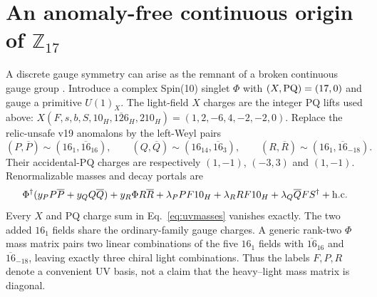 \documentclass[11pt,a4paper]{article}
\begin{document}
\section{An anomaly-free continuous origin of
\texorpdfstring{$\mathbb Z_{17}$}{Z17}}
\label{sec:uv}
A discrete gauge symmetry can arise as the remnant of a broken continuous
gauge group \cite{KW,BanksDine,Ibanez93}. Introduce a complex Spin(10)
singlet $\Phi$ with $(X,{\rm PQ})=(17,0)$ and gauge a primitive
$U(1)_X$. The light-field $X$ charges are the integer PQ lifts used above:
$X(F,s,b,S,10_H,\overline{126}_H,210_H)=(1,2,-6,4,-2,-2,0)$.
Replace the relic-unsafe v19 anomalons by the left-Weyl pairs
\begin{equation}
 (P,\overline P)\sim(16_{1},\overline{16}_{16}),\qquad
 (Q,\overline Q)\sim(16_{14},\overline{16}_{3}),\qquad
 (R,\overline R)\sim(16_{1},\overline{16}_{-18}).
\label{eq:uvfields}
\end{equation}
Their accidental-PQ charges are respectively $(1,-1)$, $(-3,3)$ and
$(1,-1)$. Renormalizable masses and decay portals are
\begin{equation}
 \Phi^\dagger(y_P P\overline P+y_QQ\overline Q)
 +y_R\Phi R\overline R
 +\lambda_P P F10_H+\lambda_R R F10_H
 +\lambda_Q\overline QF S^\dagger+{\rm h.c.}
\label{eq:uvmasses}
\end{equation}
Every $X$ and PQ charge sum in Eq.~\eqref{eq:uvmasses} vanishes exactly.
The two added $16_1$ fields share the ordinary-family gauge charges. A
generic rank-two $\Phi$ mass matrix pairs two linear combinations of the
five $16_1$ fields with $\overline{16}_{16}$ and
$\overline{16}_{-18}$, leaving exactly three chiral light combinations.
Thus the labels $F,P,R$ denote a convenient UV basis, not a claim that
the heavy--light mass matrix is diagonal.
\end{document}
